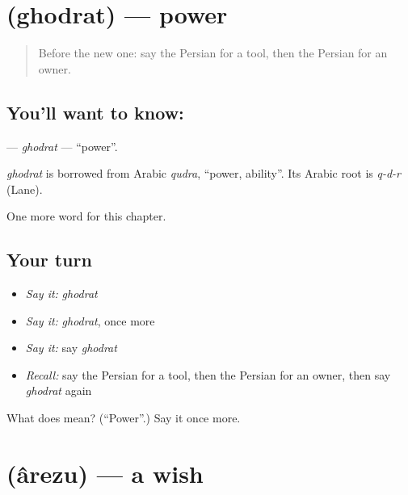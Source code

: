\section[\texorpdfstring{\fa{قدرت} (ghodrat)}{قدرت (ghodrat)}]{ (ghodrat) — power}

\label{lesson:FA-C90-ghodrat}



\begin{quote}
Before the new one: say the Persian for a tool, then the Persian for an owner.
\end{quote}

\subsection*{You'll want to know: }
\textbf{} — \emph{ghodrat} — \textquotedblleft{}power\textquotedblright{}.

\begin{cousinweb}
\emph{ghodrat} is borrowed from Arabic \emph{qudra}, \textquotedblleft{}power, ability\textquotedblright{}. Its Arabic root is \emph{q-d-r} (Lane).
\end{cousinweb}

\begin{grammarlens}[title={What you've built}]
One more word for this chapter.
\end{grammarlens}

\subsection*{Your turn}
\begin{itemize}
\raggedright
  \item \emph{Say it:} \emph{ghodrat}
  \item \emph{Say it:} \emph{ghodrat}, once more
  \item \emph{Say it:} say \emph{ghodrat}
  \item \emph{Recall:} say the Persian for a tool, then the Persian for an owner, then say \emph{ghodrat} again
\end{itemize}

\begin{tcolorbox}[breakable,colback=teal!4,colframe=teal!35!black,title={Before you move on}]
What does  mean? (\textquotedblleft{}Power\textquotedblright{}.) Say it once more.
\end{tcolorbox}
\section[\texorpdfstring{\fa{آرزو} (ârezu)}{آرزو (ârezu)}]{ (ârezu) — a wish}

